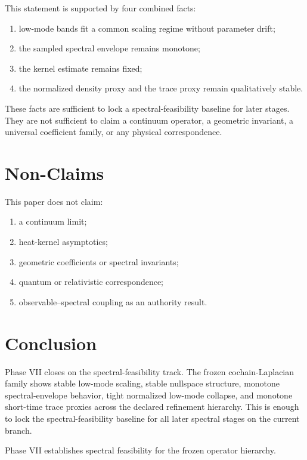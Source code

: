 \documentclass[11pt]{article}
\begin{document}
This statement is supported by four combined facts:
\begin{enumerate}
\item low-mode bands fit a common scaling regime without parameter drift;
\item the sampled spectral envelope remains monotone;
\item the kernel estimate remains fixed;
\item the normalized density proxy and the trace proxy remain qualitatively stable.
\end{enumerate}

These facts are sufficient to lock a spectral-feasibility baseline for later stages. They are not sufficient to claim a continuum operator, a geometric invariant, a universal coefficient family, or any physical correspondence.

\section{Non-Claims}

This paper does not claim:
\begin{enumerate}
\item a continuum limit;
\item heat-kernel asymptotics;
\item geometric coefficients or spectral invariants;
\item quantum or relativistic correspondence;
\item observable--spectral coupling as an authority result.
\end{enumerate}

\section{Conclusion}

Phase VII closes on the spectral-feasibility track. The frozen cochain-Laplacian family shows stable low-mode scaling, stable nullspace structure, monotone spectral-envelope behavior, tight normalized low-mode collapse, and monotone short-time trace proxies across the declared refinement hierarchy. This is enough to lock the spectral-feasibility baseline for all later spectral stages on the current branch.

Phase VII establishes spectral feasibility for the frozen operator hierarchy.
\end{document}
